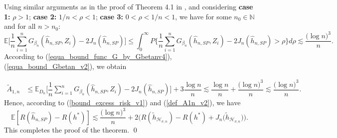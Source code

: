 \documentclass[10pt,twoside]{article}
\numberwithin{equation}{section}
\newcommand{\E}{\ensuremath{\mathbb{E}}}
\newcommand{\N}{\ensuremath{\mathbb{N}}}
\begin{document}
\medskip

\noindent
%
Using similar arguments as in the proof of Theorem 4.1 in \cite{kengne2025deep}, and considering \textbf{case 1:} $\rho > 1$; \textbf{case 2:} $1/n <\rho < 1$; \textbf{case 3:} $0< \rho < 1/n < 1$, we have for some $n_0 \in \N$ and for all $n > n_0$:
%
%
\begin{equation}\label{equa_bound_Gbetan_v2}
\E\Big[\dfrac{1}{n} \sum_{i=1}^n  G_{\beta_n}(\widehat{h}_{n,SP}, Z_i) -2J_n(\widehat{h}_{n,SP}) \Big] \leq \displaystyle \int_0^{\infty}  P\Bigg\{\dfrac{1}{n} \sum_{i=1}^n  G_{\beta_n}(\widehat{h}_{n,SP}, Z_i) -2J_n(\widehat{h}_{n,SP}) > \rho \Bigg\} d\rho \lesssim \dfrac{\big(\log n\big)^3}{n}.
\end{equation}
%
According to (\ref{equa_bound_func_G_by_Gbetanv4}),(\ref{equa_bound_Gbetan_v2}), we obtain

\begin{align}\label{def_A1n_v2}
   \widetilde{A}_{1, n} & \leq \E_{D_n}\Bigg[\dfrac{1}{n} \sum_{i=1}^n G_{\beta_n}(\widehat{h}_{n,SP}, Z_i) -2J_n(\widehat{h}_{n,SP}) \Bigg] + 3\dfrac{\log n}{n} \lesssim \dfrac{\log n}{n} + \dfrac{\big(\log n\big)^3}{n}  \lesssim   \dfrac{\big(\log n\big)^3}{n} .
\end{align}
%
Hence, according to (\ref{bound_excess_risk_v1}) and (\ref{def_A1n_v2}), we have
%
\begin{equation*} 
 \E[R(\widehat{h}_{n,SP}) - R(h^*) ]  \lesssim  \dfrac{\big(\log n\big)^3}{n} + 2\big(R(\widetilde{h}_{\mathcal{H}_{\sigma, n}}) - R(h^*) +J_n \big(\widetilde{ h}_{\mathcal{H}_{\sigma, n}} \big)\big).
\end{equation*}
%
This completes the proof of the theorem.
\qed
\end{document}
